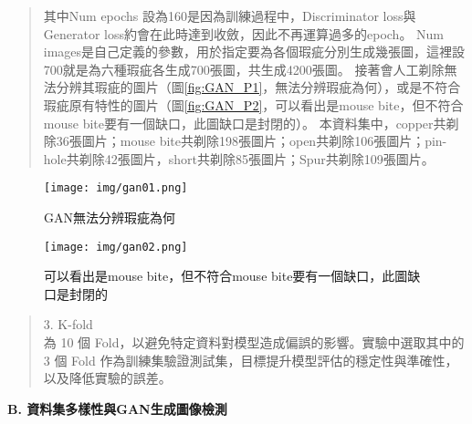 \begin{flushleft}
\begin{abstract}
\begin{center}
    \end{center}
  \hspace{2em}
  其中Num epochs 設為160是因為訓練過程中，Discriminator loss與Generator loss約會在此時達到收斂，因此不再運算過多的epoch。
  Num images是自己定義的參數，用於指定要為各個瑕疵分別生成幾張圖，這裡設700就是為六種瑕疵各生成700張圖，共生成4200張圖。
  接著會人工剃除無法分辨其瑕疵的圖片（圖\ref{fig:GAN_P1}，無法分辨瑕疵為何），或是不符合瑕疵原有特性的圖片（圖\ref{fig:GAN_P2}，可以看出是mouse bite，但不符合mouse bite要有一個缺口，此圖缺口是封閉的）。
  本資料集中，copper共剃除36張圖片；mouse bite共剃除198張圖片；open共剃除106張圖片；pin-hole共剃除42張圖片，short共剃除85張圖片；Spur共剃除109張圖片。
  \end{abstract}
  \begin{figure}[htbp]
    \centering 
    \texttt{[image: img/gan01.png]} 
    \caption{GAN無法分辨瑕疵為何}
    \label{fig:GAN_P3}
    \texttt{[image: img/gan02.png]}
    \caption{可以看出是mouse bite，但不符合mouse bite要有一個缺口，此圖缺口是封閉的}
    \label{fig:GAN_P4}
  \end{figure}
  \FloatBarrier
  \begin{abstract}
    3. K-fold
    \\\hspace{2em}
    為 10 個 Fold，以避免特定資料對模型造成偏誤的影響。實驗中選取其中的 3 個 Fold 作為訓練集驗證測試集，目標提升模型評估的穩定性與準確性，以及降低實驗的誤差。
  \end{abstract}

  {\fontsize{10}{0} \bf B. 資料集多樣性與GAN生成圖像檢測}


\end{flushleft}
